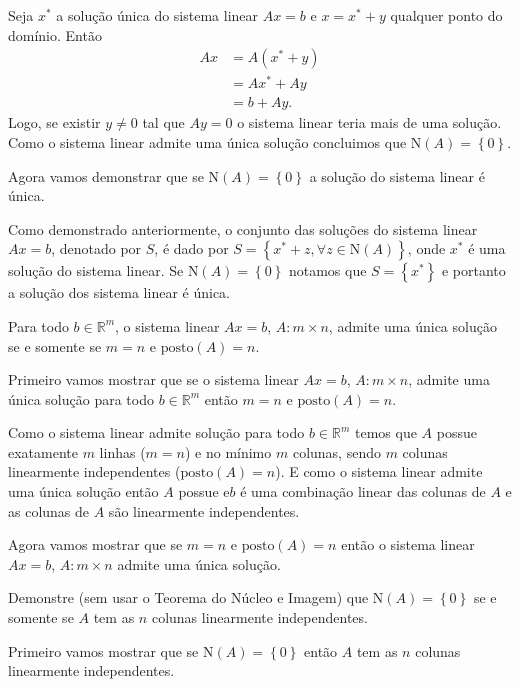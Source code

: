 \documentclass[a4paper,12pt, leqno, answers]{exam}
\newcommand{\EN}{\text{N}}
\newcommand{\posto}{\text{posto}}
\begin{document}
\begin{questions}
\begin{solution}
        Seja $x^*$ a solu\c{c}\~{a}o \'{u}nica do sistema linear $A x = b$ e $x = x^* + y$ qualquer ponto do dom\'{i}nio. Ent\~{a}o
        \begin{align*}
            A x &= A \left( x^* + y \right) \\
            &= A x^* + A y \\
            &= b + A y.
        \end{align*}
        Logo, se existir $y \neq 0$ tal que $A y = 0$ o sistema linear teria mais de uma solu\c{c}\~{a}o. Como o sistema linear admite uma \'{u}nica solu\c{c}\~{a}o concluimos que $\EN (A) = \left\{ 0 \right\}$.

        Agora vamos demonstrar que se $\EN (A) = \left\{ 0 \right\}$ a solu\c{c}\~{a}o do sistema linear \'{e} \'{u}nica.

        Como demonstrado anteriormente, o conjunto das solu\c{c}\~{o}es do sistema linear $A x = b$, denotado por $S$, \'{e} dado por $S = \left\{ x^* + z, \forall z \in \EN (A) \right\}$, onde $x^*$ \'{e} uma solu\c{c}\~{a}o do sistema linear. Se $\EN (A) = \left\{ 0 \right\}$ notamos que $S = \left\{ x^* \right\}$ e portanto a solu\c{c}\~{a}o dos sistema linear \'{e} \'{u}nica.
    \end{solution}

    \question Para todo $b \in \mathbb{R}^m$, o sistema linear $A x = b$, $A : m \times n$, admite uma \'{u}nica solu\c{c}\~{a}o se e somente se $m = n$ e $\posto (A) = n$.
    \begin{solution}
        Primeiro vamos mostrar que se o sistema linear $A x = b$, $A: m \times n$, admite uma \'{u}nica solu\c{c}\~{a}o para todo $b \in \mathbb{R}^m$ ent\~{a}o $m = n$ e $\posto (A) = n$.

        Como o sistema linear admite solu\c{c}\~{a}o para todo $b \in \mathbb{R}^m$ temos que $A$ possue exatamente $m$ linhas ($m = n$) e no m\'{i}nimo $m$ colunas, sendo $m$ colunas linearmente independentes ($\posto (A) = n$). E como o sistema linear admite uma \'{u}nica solu\c{c}\~{a}o ent\~{a}o $A$ possue e$b$ \'{e} uma combina\c{c}\~{a}o linear das colunas de $A$ e as colunas de $A$ s\~{a}o linearmente independentes. 

        Agora vamos mostrar que se $m = n$ e $\posto (A) = n$ ent\~{a}o o sistema linear $A x = b$, $A: m \times n$ admite uma \'{u}nica solu\c{c}\~{a}o.
        
    \end{solution}

    \question Demonstre (sem usar o Teorema do N\'{u}cleo e Imagem) que $\EN (A) = \left\{ 0 \right\}$ se e somente se $A$ tem as $n$ colunas linearmente independentes.
    \begin{solution}
        Primeiro vamos mostrar que se $\EN (A) = \left\{ 0 \right\}$ ent\~{a}o $A$ tem as $n$ colunas linearmente independentes.


\end{solution}
\end{questions}
\end{document}
